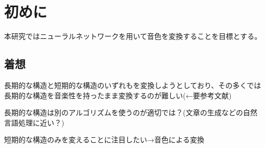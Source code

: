 \chapter{初めに}



本研究ではニューラルネットワークを用いて音色を変換することを目標とする。







\section{着想}


長期的な構造と短期的な構造のいずれもを変換しようとしており、その多くでは長期的な構造を音楽性を持ったまま変換するのが難しい(←要参考文献)

長期的な構造は別のアルゴリズムを使うのが適切では？(文章の生成などの自然言語処理に近い？)

短期的な構造のみを変えることに注目したい→音色による変換
